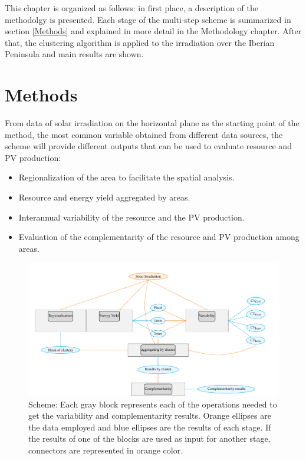 This chapter is organized as follows: in first place, a description of the methodolgy is presented. Each stage of the multi-step scheme is summarized in section \ref{Methods} and explained in more detail in the Methodology chapter. After that, the clustering algorithm is applied to the irradiation over the Iberian Peninsula and main results are shown.\\

\section{Methods}


From data of solar irradiation on the horizontal plane as the starting point of the method, the most common variable obtained from different data sources, the scheme will provide different outputs that can be used to evaluate resource and PV production:

\begin{itemize}
\item Regionalization of the area to facilitate the spatial analysis.
\item Resource and energy yield aggregated by areas.
\item Interannual variability of the resource and the PV production.
\item Evaluation of the complementarity of the resource and PV production among areas.
\end{itemize}  
 
\begin{figure}[h!]
\centering\includegraphics[width=1\textwidth]{figs/capitulo5/multi_step}
\caption{Scheme: Each gray block represents each of the operations needed to get the variability and complementarity results. Orange ellipses are the data employed and blue ellipses are the results of each stage. If the results of one of the blocks are used as input for another stage, connectors are represented in orange color.}
\label{fig:multi_step}
\end{figure}

